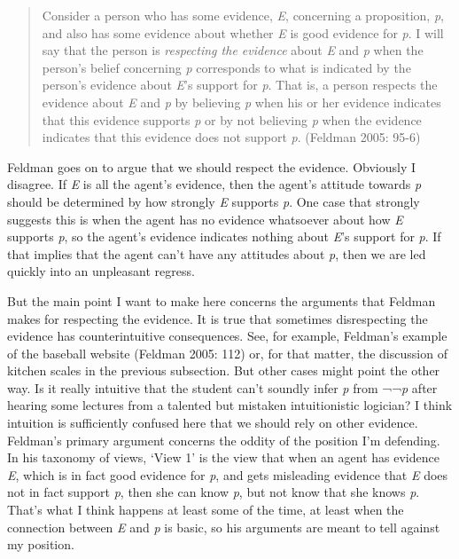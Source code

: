 \documentclass[
  10pt,
  letterpaper,
  DIV=11,
  numbers=noendperiod,
  twoside]{scrartcl}
\begin{document}
\begin{quote}
Consider a person who has some evidence, \emph{E}, concerning a
proposition, \emph{p}, and also has some evidence about whether \emph{E}
is good evidence for \emph{p}. I will say that the person is
\emph{respecting the evidence} about \emph{E} and \emph{p} when the
person's belief concerning \emph{p} corresponds to what is indicated by
the person's evidence about \emph{E}'s support for \emph{p}. That is, a
person respects the evidence about \emph{E} and \emph{p} by believing
\emph{p} when his or her evidence indicates that this evidence supports
\emph{p} or by not believing \emph{p} when the evidence indicates that
this evidence does not support \emph{p}. (Feldman 2005: 95-6)
\end{quote}

Feldman goes on to argue that we should respect the evidence. Obviously
I disagree. If \emph{E} is all the agent's evidence, then the agent's
attitude towards \emph{p} should be determined by how strongly \emph{E}
supports \emph{p}. One case that strongly suggests this is when the
agent has no evidence whatsoever about how \emph{E} supports \emph{p},
so the agent's evidence indicates nothing about \emph{E}'s support for
\emph{p}. If that implies that the agent can't have any attitudes about
\emph{p}, then we are led quickly into an unpleasant regress.

But the main point I want to make here concerns the arguments that
Feldman makes for respecting the evidence. It is true that sometimes
disrespecting the evidence has counterintuitive consequences. See, for
example, Feldman's example of the baseball website (Feldman 2005: 112)
or, for that matter, the discussion of kitchen scales in the previous
subsection. But other cases might point the other way. Is it really
intuitive that the student can't soundly infer \emph{p} from ¬¬\emph{p}
after hearing some lectures from a talented but mistaken intuitionistic
logician? I think intuition is sufficiently confused here that we should
rely on other evidence. Feldman's primary argument concerns the oddity
of the position I'm defending. In his taxonomy of views, `View 1' is the
view that when an agent has evidence \emph{E}, which is in fact good
evidence for \emph{p}, and gets misleading evidence that \emph{E} does
not in fact support \emph{p}, then she can know \emph{p}, but not know
that she knows \emph{p}. That's what I think happens at least some of
the time, at least when the connection between \emph{E} and \emph{p} is
basic, so his arguments are meant to tell against my position.
\end{document}
